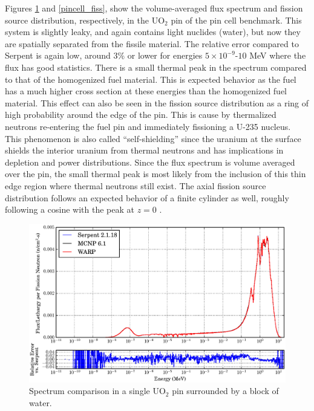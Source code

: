 Figures \ref{pincell_spec} and \ref{pincell_fiss}, show the volume-averaged flux spectrum and fission source distribution, respectively, in the UO$_2$ pin of the pin cell benchmark.  This system is slightly leaky, and again contains light nuclides (water), but now they are spatially separated from the fissile material.  The relative error compared to Serpent is again low, around 3\% or lower for energies $5\times10^{-9}$-$10$ MeV where the flux has good statistics.  There is a small thermal peak in the spectrum compared to that of the homogenized fuel material.  This is expected behavior as the fuel has a much higher cross section at these energies than the homogenized fuel material.  This effect can also be seen in the fission source distribution as a ring of high probability around the edge of the pin.  This is cause by thermalized neutrons re-entering the fuel pin and immediately fissioning a U-235 nucleus.  This phenomenon is also called ``self-shielding'' since the uranium at the surface shields the interior uranium from thermal neutrons and has implications in depletion and power distributions.  Since the flux spectrum is volume averaged over the pin, the small thermal peak is most likely from the inclusion of this thin edge region where thermal neutrons still exist.  The axial fission source distribution follows an expected behavior of a finite cylinder as well, roughly following a cosine with the peak at $z=0$ \cite{duderstadt}.

 
\begin{figure}[h!] 
\centering
\includegraphics[width=\textwidth,trim= 1cm 0cm 1cm 0cm]{graphics/finalresults/pincell_spec-6.eps}
\caption{Spectrum comparison in a single UO$_2$ pin surrounded by a block of water. \label{pincell_spec} }
\end{figure}

